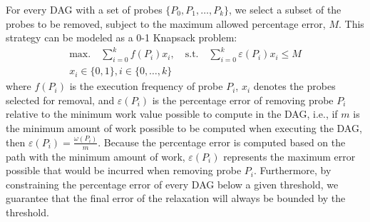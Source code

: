 For every DAG with a set of probes $\{P_0, P_1, \ldots, P_k\}$,
we select a subset of the probes to be removed, subject to
the maximum allowed percentage error, $M$.
This strategy can be modeled as a 0-1 Knapsack problem:
\begin{gather*}
\textrm{max.}\quad\sum_{i=0}^{k} f(P_i)x_i,\quad
\textrm{s.t.}\quad\sum_{i=0}^{k} \varepsilon(P_i)x_i \leq M \\
x_i\in\{0,1\}, i\in\{0,\ldots,k\}
\end{gather*}
where $f(P_i)$ is the execution frequency of probe $P_i$, $x_i$ denotes the
probes selected for removal, and $\varepsilon(P_i)$ is the percentage error of
removing probe $P_i$ relative to the minimum work value possible to compute in
the DAG, i.e., if $m$ is the minimum amount of work possible to be computed when
executing the DAG, then $\varepsilon(P_i) = \frac{\omega(P_i)}{m}$.
Because the percentage error is computed based on the path with the minimum
amount of work, $\varepsilon(P_i)$ represents the maximum error possible that
would be incurred when removing probe $P_i$.
Furthermore, by constraining the percentage error of every DAG below a given
threshold, we guarantee that the final error of the relaxation will always be
bounded by the threshold.
%
